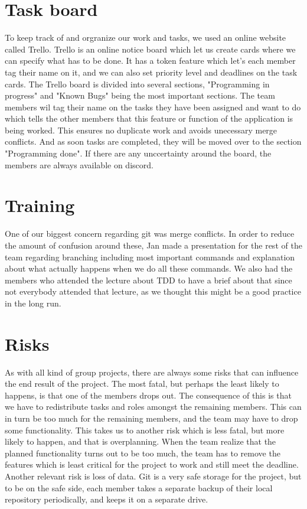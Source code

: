 \documentclass{article}
\begin{document}
\section*{Task board}
To keep track of and orgranize our work and tasks, we used an online website called Trello. Trello is an online notice board which let us create cards where we can specify what has to be done. It has a token feature which let's each member tag their name on it, and we can also set priority level and deadlines on the task cards. The Trello board is divided into several sections, "Programming in progress" and "Known Bugs" being the most important sections. The team members wil tag their name on the tasks they have been assigned and want to do which tells the other members that this feature or function of the application is being worked. This ensures no duplicate work and avoids unecessary merge conflicts. And as soon tasks are completed, they will be moved over to the section "Programming done". If there are any unccertainty around the board, the members are always available on discord.

\section*{Training}
One of our biggest concern regarding git was merge conflicts. In order to reduce the amount of confusion around these, Jan made a presentation for the rest of the team regarding branching including most important commands and explanation about what actually happens when we do all these commands.
We also had the members who attended the lecture about TDD to have a brief about that since not everybody attended that lecture, as we thought this might be a good practice in the long run.

\section*{Risks}
As with all kind of group projects, there are always some risks that can influence the end result of the project. The most fatal, but perhaps the least likely to happens, is that one of the members drops out. The consequence of this is that we have to redistribute tasks and roles amongst the remaining members. This can in turn be too much for the remaining members, and the team may have to drop some functionality. This takes us to another risk which is less fatal, but more likely to happen, and that is overplanning. When the team realize that the planned functionality turns out to be too much, the team has to remove the features which is least critical for the project to work and still meet the deadline.
Another relevant risk is loss of data. Git is a very safe storage for the project, but to be on the safe side, each member takes a separate backup of their local repository periodically, and keeps it on a separate drive.
\end{document}
